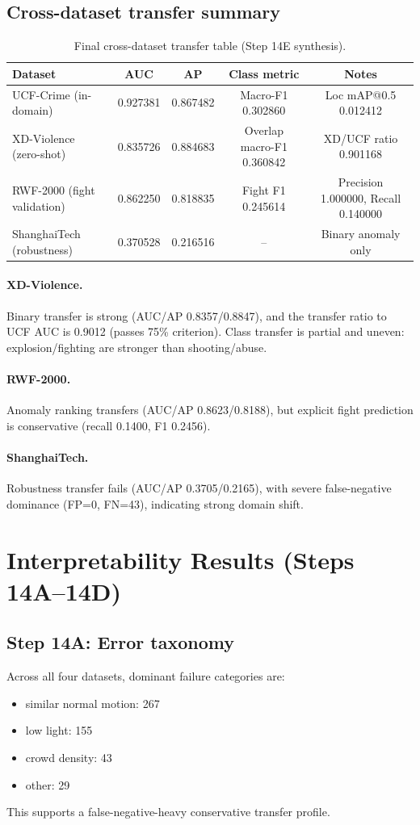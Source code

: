 \documentclass[11pt]{article}
\begin{document}
\subsection{Cross-dataset transfer summary}
\begin{table}[t]
\centering
\small
\caption{Final cross-dataset transfer table (Step 14E synthesis).}
\label{tab:cross_dataset}
\begin{tabular}{lcccc}
\toprule
Dataset & AUC & AP & Class metric & Notes \\
\midrule
UCF-Crime (in-domain) & 0.927381 & 0.867482 & Macro-F1 0.302860 & Loc mAP@0.5 0.012412 \\
XD-Violence (zero-shot) & 0.835726 & 0.884683 & Overlap macro-F1 0.360842 & XD/UCF ratio 0.901168 \\
RWF-2000 (fight validation) & 0.862250 & 0.818835 & Fight F1 0.245614 & Precision 1.000000, Recall 0.140000 \\
ShanghaiTech (robustness) & 0.370528 & 0.216516 & -- & Binary anomaly only \\
\bottomrule
\end{tabular}
\end{table}

\paragraph{XD-Violence.}
Binary transfer is strong (AUC/AP 0.8357/0.8847), and the transfer ratio to UCF AUC is 0.9012 (passes 75\% criterion). Class transfer is partial and uneven: explosion/fighting are stronger than shooting/abuse.

\paragraph{RWF-2000.}
Anomaly ranking transfers (AUC/AP 0.8623/0.8188), but explicit fight prediction is conservative (recall 0.1400, F1 0.2456).

\paragraph{ShanghaiTech.}
Robustness transfer fails (AUC/AP 0.3705/0.2165), with severe false-negative dominance (FP=0, FN=43), indicating strong domain shift.

\section{Interpretability Results (Steps 14A--14D)}
\subsection{Step 14A: Error taxonomy}
Across all four datasets, dominant failure categories are:
\begin{itemize}
  \item similar normal motion: 267
  \item low light: 155
  \item crowd density: 43
  \item other: 29
\end{itemize}
This supports a false-negative-heavy conservative transfer profile.
\end{document}
